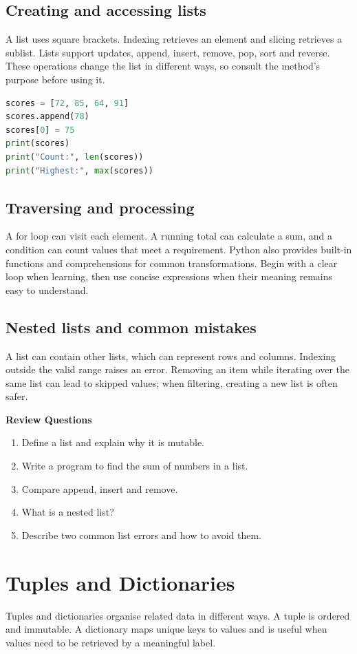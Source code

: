 \documentclass[11pt,openany,oneside]{book}
\newcommand{\reviewtitle}{\par\noindent\textbf{\color{Navy}Review Questions}\par}
\begin{document}
\section{Creating and accessing lists}
A list uses square brackets. Indexing retrieves an element and slicing retrieves a sublist. Lists support updates, append, insert, remove, pop, sort and reverse. These operations change the list in different ways, so consult the method's purpose before using it.

\begin{lstlisting}[style=webcode,language=Python]
scores = [72, 85, 64, 91]
scores.append(78)
scores[0] = 75
print(scores)
print("Count:", len(scores))
print("Highest:", max(scores))
\end{lstlisting}

\section{Traversing and processing}
A for loop can visit each element. A running total can calculate a sum, and a condition can count values that meet a requirement. Python also provides built-in functions and comprehensions for common transformations. Begin with a clear loop when learning, then use concise expressions when their meaning remains easy to understand.

\section{Nested lists and common mistakes}
A list can contain other lists, which can represent rows and columns. Indexing outside the valid range raises an error. Removing an item while iterating over the same list can lead to skipped values; when filtering, creating a new list is often safer.

\reviewtitle
\begin{enumerate}
\item Define a list and explain why it is mutable.
\item Write a program to find the sum of numbers in a list.
\item Compare append, insert and remove.
\item What is a nested list?
\item Describe two common list errors and how to avoid them.
\end{enumerate}

\chapter{Tuples and Dictionaries}
Tuples and dictionaries organise related data in different ways. A tuple is ordered and immutable. A dictionary maps unique keys to values and is useful when values need to be retrieved by a meaningful label.
\end{document}
